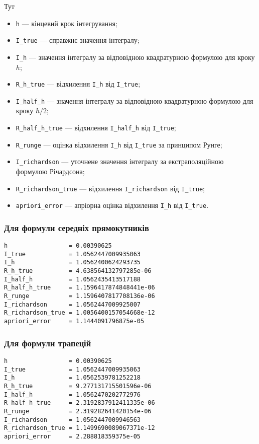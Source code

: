 Тут 

\begin{itemize}
	\item {\tt h} --- кінцевий крок інтегрування;
	\item {\tt I\_true} --- справжнє значення інтегралу;
	\item {\tt I\_h} --- значення інтегралу за відповідною квадратурною формулою для кроку $h$;
	\item {\tt R\_h\_true} --- відхилення {\tt I\_h} від {\tt I\_true};
	\item {\tt I\_half\_h} --- значення інтегралу за відповідною квадратурною формулою для кроку $h / 2$;
	\item {\tt R\_half\_h\_true} --- відхилення {\tt I\_half\_h} від {\tt I\_true};
	\item {\tt R\_runge} --- оцінка відхилення {\tt I\_h} від {\tt I\_true} за принципом Рунге;
	\item {\tt I\_richardson} --- уточнене значення інтегралу за екстраполяційною формулою Річардсона;
	\item {\tt R\_richardson\_true} --- відхилення {\tt I\_richardson} від {\tt I\_true};
	\item {\tt apriori\_error} --- апріорна оцінка відхилення {\tt I\_h} від {\tt I\_true}.
\end{itemize}

\subsubsection{Для формули середніх прямокутників}

\begin{verbatim}
h                 = 0.00390625
I_true            = 1.0562447009935063
I_h               = 1.0562400624293735
R_h_true          = 4.638564132797285e-06
I_half_h          = 1.0562435413517188
R_half_h_true     = 1.1596417874848441e-06
R_runge           = 1.1596407817708136e-06
I_richardson      = 1.0562447009925007
R_richardson_true = 1.0056400157054668e-12
apriori_error     = 1.1444091796875e-05
\end{verbatim}

\subsubsection{Для формули трапецій}

\begin{verbatim}
h                 = 0.00390625
I_true            = 1.0562447009935063
I_h               = 1.0562539781252218
R_h_true          = 9.277131715501596e-06
I_half_h          = 1.0562470202772976
R_half_h_true     = 2.3192837912411335e-06
R_runge           = 2.319282641420154e-06
I_richardson      = 1.0562447009946563
R_richardson_true = 1.1499690089067371e-12
apriori_error     = 2.288818359375e-05
\end{verbatim}

